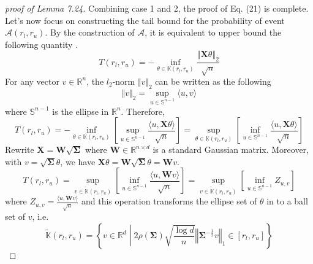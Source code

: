 \documentclass[a4paper, 11pt]{article}
\begin{document}
\begin{proof}[proof of Lemma 7.24]
Combining case 1 and 2, the proof of Eq. (21) is complete. Let's now focus on constructing the tail bound for the probability of event $\mathcal{A}(r_l, r_u)$. By the construction of $\mathcal{A}$, it is equivalent to upper bound the following quantity . 
\begin{equation}
T(r_l, r_u) = -\inf_{\theta\in\mathbb{K}(r_l, r_u)}\frac{\left\Vert\mathbf{X}\theta \right\Vert_2}{\sqrt{n}}
\end{equation}
For any vector $v\in\mathbb{R}^n$, the $l_2$-norm $\Vert v\Vert_2$ can be written as the following
\begin{equation}
\Vert v\Vert_2 = \sup_{u\in\mathbb{S}^{n-1}}\langle u,v \rangle
\end{equation}
where $\mathbb{S}^{n-1}$ is the ellipse in $\mathbb{R}^n$. Therefore, 
\begin{equation}
T(r_l, r_u) = -\inf_{\theta\in\mathbb{K}(r_l, r_u)}\left[\sup_{u\in\mathbb{S}^{n-1}}\frac{\langle u,\mathbf{X}\theta \rangle}{\sqrt{n}}\right] = \sup_{\theta\in\mathbb{K}(r_l, r_u)}\left[\inf_{u\in\mathbb{S}^{n-1}}\frac{\langle u,\mathbf{X}\theta \rangle}{\sqrt{n}}\right]
\end{equation}
Rewrite $\mathbf{X} = \mathbf{W}\sqrt{\mathbf{\Sigma}}$ where $\mathbf{W}\in\mathbb{R}^{n\times d}$ is a standard Gaussian matrix. Moreover, with $v = \sqrt{\mathbf{\Sigma}}\theta$, we have $\mathbf{X}\theta = \mathbf{W}\sqrt{\mathbf{\Sigma}}\theta = \mathbf{W}v$. 
\begin{equation}
T(r_l, r_u) = \sup_{v\in\tilde{\mathbb{K}}(r_l, r_u)}\left[\inf_{u\in\mathbb{S}^{n-1}}\frac{\langle u,\mathbf{W}v \rangle}{\sqrt{n}}\right] = \sup_{v\in\tilde{\mathbb{K}}(r_l, r_u)}\left[\inf_{u\in\mathbb{S}^{n-1}}Z_{u,v}\right]
\end{equation}
where $Z_{u,v} = \frac{\langle u,\mathbf{W}v \rangle}{\sqrt{n}}$ and this operation transforms the ellipse set of $\theta$ in to a ball set of $v$, i.e. 
\begin{equation}
\tilde{\mathbb{K}}(r_l, r_u) = \left\{ v\in\mathbb{R}^d \middle| 2\rho(\mathbf{\Sigma})\sqrt{\frac{\log d}{n}}\left\Vert\mathbf{\Sigma}^{-\frac{1}{2}}v \right\Vert_1\in\left[r_l, r_u \right]\right\}
\end{equation}


\end{proof}
\end{document}
